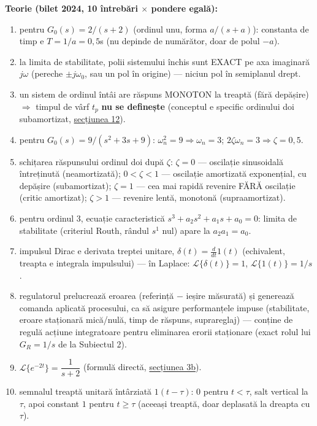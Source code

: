 \documentclass[10pt,a4paper]{article}
\begin{document}
\begin{keyeq}\color{red!65!black}
\textbf{Teorie (bilet 2024, 10 întrebări $\times$ pondere egală):}
\begin{enumerate}
\item pentru $G_0(s){=}2/(s{+}2)$ (ordinul unu, forma $a/(s{+}a)$): constanta de timp e $T{=}1/a{=}0{,}5$s (nu depinde de numărător, doar de polul $-a$).
\item la limita de stabilitate, polii sistemului închis sunt EXACT pe axa imaginară $j\omega$ (pereche $\pm j\omega_0$, sau un pol în origine) — niciun pol în semiplanul drept.
\item un sistem de ordinul întâi are răspuns MONOTON la treaptă (fără depășire) $\Rightarrow$ timpul de vârf $t_p$ \textbf{nu se definește} (conceptul e specific ordinului doi subamortizat, \hyperref[sec:12]{secțiunea 12}).
\item pentru $G_0(s){=}9/(s^2{+}3s{+}9)$: $\omega_n^2{=}9\Rightarrow\omega_n{=}3$; $2\zeta\omega_n{=}3\Rightarrow\zeta{=}0{,}5$.
\item schițarea răspunsului ordinul doi după $\zeta$: $\zeta{=}0$ — oscilație sinusoidală întreținută (neamortizată); $0{<}\zeta{<}1$ — oscilație amortizată exponențial, cu depășire (subamortizat); $\zeta{=}1$ — cea mai rapidă revenire FĂRĂ oscilație (critic amortizat); $\zeta{>}1$ — revenire lentă, monotonă (supraamortizat).
\item pentru ordinul 3, ecuație caracteristică $s^3{+}a_2s^2{+}a_1s{+}a_0{=}0$: limita de stabilitate (criteriul Routh, rândul $s^1$ nul) apare la $a_2a_1{=}a_0$.
\item impulsul Dirac e derivata treptei unitare, $\delta(t){=}\frac{d}{dt}1(t)$ (echivalent, treapta e integrala impulsului) — în Laplace: $\mathcal L\{\delta(t)\}{=}1$, $\mathcal L\{1(t)\}{=}1/s$.
\item regulatorul prelucrează eroarea (referință $-$ ieșire măsurată) și generează comanda aplicată procesului, ca să asigure performanțele impuse (stabilitate, eroare staționară mică/nulă, timp de răspuns, suprareglaj) — conține de regulă acțiune integratoare pentru eliminarea erorii staționare (exact rolul lui $G_R{=}1/s$ de la Subiectul 2).
\item $\mathcal L\{e^{-2t}\}=\dfrac1{s+2}$ (formulă directă, \hyperref[sec:3b]{secțiunea 3b}).
\item semnalul treaptă unitară întârziată $1(t-\tau)$: $0$ pentru $t{<}\tau$, salt vertical la $\tau$, apoi constant $1$ pentru $t{\ge}\tau$ (aceeași treaptă, doar deplasată la dreapta cu $\tau$).
\end{enumerate}
\end{keyeq}
\end{document}
